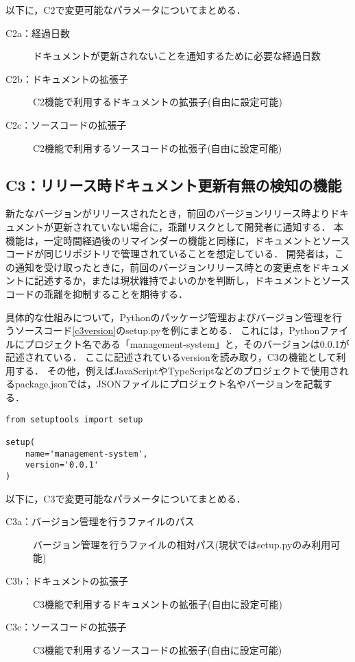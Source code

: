 以下に，C2で変更可能なパラメータについてまとめる．
\begin{description}
    \item[C2a：経過日数] ドキュメントが更新されないことを通知するために必要な経過日数
    \item[C2b：ドキュメントの拡張子] C2機能で利用するドキュメントの拡張子(自由に設定可能)
    \item[C2c：ソースコードの拡張子] C2機能で利用するソースコードの拡張子(自由に設定可能)
\end{description}

\subsection{C3：リリース時ドキュメント更新有無の検知の機能}
\label{c3}
新たなバージョンがリリースされたとき，前回のバージョンリリース時よりドキュメントが更新されていない場合に，乖離リスクとして開発者に通知する．
本機能は，一定時間経過後のリマインダーの機能と同様に，ドキュメントとソースコードが同じリポジトリで管理されていることを想定している．
開発者は，この通知を受け取ったときに，前回のバージョンリリース時との変更点をドキュメントに記述するか，または現状維持でよいのかを判断し，ドキュメントとソースコードの乖離を抑制することを期待する．

具体的な仕組みについて，Pythonのパッケージ管理およびバージョン管理を行うソースコード\ref{c3version}のsetup.pyを例にまとめる．
これには，Pythonファイルにプロジェクト名である「management-system」と，そのバージョンは0.0.1が記述されている．
ここに記述されているversionを読み取り，C3の機能として利用する．
その他，例えばJavaScriptやTypeScriptなどのプロジェクトで使用されるpackage.jsonでは，JSONファイルにプロジェクト名やバージョンを記載する．

\begin{lstlisting}[caption=setup.py, label=c3version]
from setuptools import setup

setup(
    name='management-system',
    version='0.0.1'
)    
\end{lstlisting}

以下に，C3で変更可能なパラメータについてまとめる．
\begin{description}
    \item[C3a：バージョン管理を行うファイルのパス] バージョン管理を行うファイルの相対パス(現状ではsetup.pyのみ利用可能)
    \item[C3b：ドキュメントの拡張子] C3機能で利用するドキュメントの拡張子(自由に設定可能)
    \item[C3c：ソースコードの拡張子] C3機能で利用するソースコードの拡張子(自由に設定可能)
\end{description}

